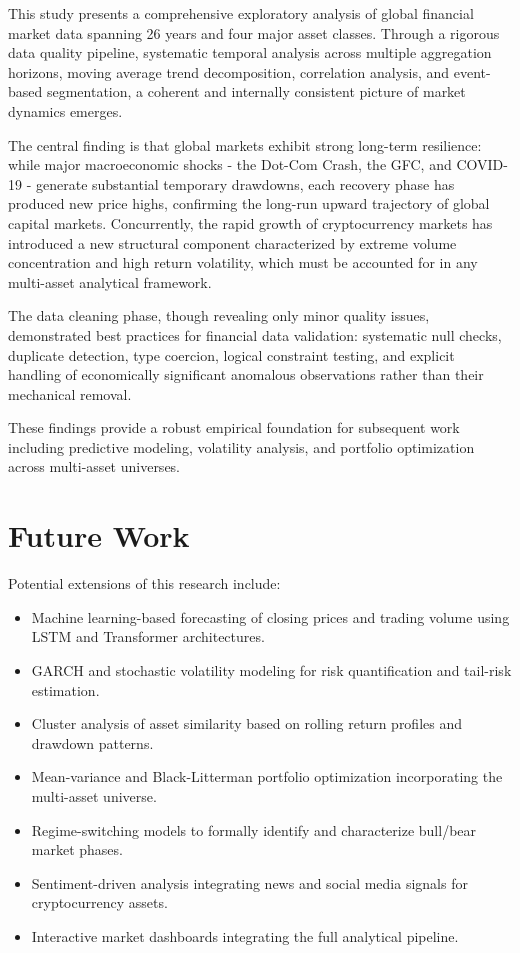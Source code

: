 \documentclass[10pt,a4paper,twocolumn]{article}
\begin{document}
This study presents a comprehensive exploratory analysis of global financial market data spanning 26 years and four major asset classes. Through a rigorous data quality pipeline, systematic temporal analysis across multiple aggregation horizons, moving average trend decomposition, correlation analysis, and event-based segmentation, a coherent and internally consistent picture of market dynamics emerges.

The central finding is that global markets exhibit strong long-term resilience: while major macroeconomic shocks - the Dot-Com Crash, the GFC, and COVID-19 - generate substantial temporary drawdowns, each recovery phase has produced new price highs, confirming the long-run upward trajectory of global capital markets. Concurrently, the rapid growth of cryptocurrency markets has introduced a new structural component characterized by extreme volume concentration and high return volatility, which must be accounted for in any multi-asset analytical framework.

The data cleaning phase, though revealing only minor quality issues, demonstrated best practices for financial data validation: systematic null checks, duplicate detection, type coercion, logical constraint testing, and explicit handling of economically significant anomalous observations rather than their mechanical removal.

These findings provide a robust empirical foundation for subsequent work including predictive modeling, volatility analysis, and portfolio optimization across multi-asset universes.

\section{Future Work}

Potential extensions of this research include:
\begin{itemize}[leftmargin=1.2em, itemsep=1pt, topsep=2pt]
  \item Machine learning-based forecasting of closing prices and trading volume using LSTM and Transformer architectures.
  \item GARCH and stochastic volatility modeling for risk quantification and tail-risk estimation.
  \item Cluster analysis of asset similarity based on rolling return profiles and drawdown patterns.
  \item Mean-variance and Black-Litterman portfolio optimization incorporating the multi-asset universe.
  \item Regime-switching models to formally identify and characterize bull/bear market phases.
  \item Sentiment-driven analysis integrating news and social media signals for cryptocurrency assets.
  \item Interactive market dashboards integrating the full analytical pipeline.
\end{itemize}
\end{document}
